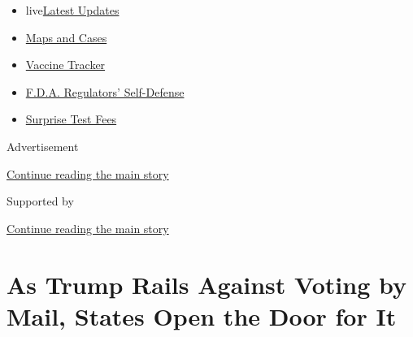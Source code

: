 \begin{itemize}
\tightlist
\item
  live\href{https://www.nytimes3xbfgragh.onion/2020/09/11/world/covid-19-coronavirus.html?name=styln-coronavirus-national\&region=TOP_BANNER\&block=storyline_menu_recirc\&action=click\&pgtype=Article\&impression_id=a657b1b1-f4be-11ea-8528-3d6bd6e3ff1c\&variant=undefined}{Latest
  Updates}
\item
  \href{https://www.nytimes3xbfgragh.onion/interactive/2020/us/coronavirus-us-cases.html?name=styln-coronavirus-national\&region=TOP_BANNER\&block=storyline_menu_recirc\&action=click\&pgtype=Article\&impression_id=a657b1b2-f4be-11ea-8528-3d6bd6e3ff1c\&variant=undefined}{Maps
  and Cases}
\item
  \href{https://www.nytimes3xbfgragh.onion/interactive/2020/science/coronavirus-vaccine-tracker.html?name=styln-coronavirus-national\&region=TOP_BANNER\&block=storyline_menu_recirc\&action=click\&pgtype=Article\&impression_id=a657b1b3-f4be-11ea-8528-3d6bd6e3ff1c\&variant=undefined}{Vaccine
  Tracker}
\item
  \href{https://www.nytimes3xbfgragh.onion/2020/09/10/us/politics/fda-coronavirus-vaccine.html?name=styln-coronavirus-national\&region=TOP_BANNER\&block=storyline_menu_recirc\&action=click\&pgtype=Article\&impression_id=a657d8c0-f4be-11ea-8528-3d6bd6e3ff1c\&variant=undefined}{F.D.A.
  Regulators' Self-Defense}
\item
  \href{https://www.nytimes3xbfgragh.onion/2020/09/09/upshot/coronavirus-surprise-test-fees.html?name=styln-coronavirus-national\&region=TOP_BANNER\&block=storyline_menu_recirc\&action=click\&pgtype=Article\&impression_id=a657d8c1-f4be-11ea-8528-3d6bd6e3ff1c\&variant=undefined}{Surprise
  Test Fees}
\end{itemize}

Advertisement

\protect\hyperlink{after-top}{Continue reading the main story}

Supported by

\protect\hyperlink{after-sponsor}{Continue reading the main story}

\hypertarget{as-trump-rails-against-voting-by-mail-states-open-the-door-for-it}{%
\section{As Trump Rails Against Voting by Mail, States Open the Door for
It}\label{as-trump-rails-against-voting-by-mail-states-open-the-door-for-it}}

